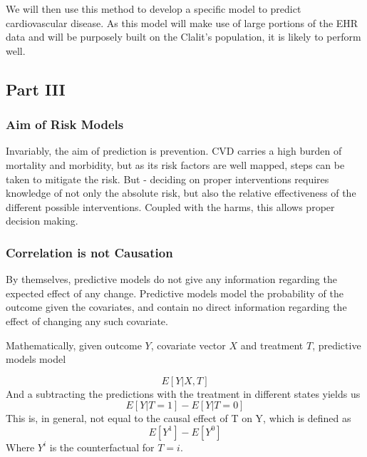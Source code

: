 \documentclass[a4paper,12pt]{article}
\begin{document}
			We will then use this method to develop a specific model to predict cardiovascular disease. As this model will make use of large portions of the EHR data and will be purposely built on the Clalit's population, it is likely to perform well.
		
		\subsection{Part III}
		
			\subsubsection{Aim of Risk Models}
			
			Invariably, the aim of prediction is prevention. CVD carries a high burden of mortality and morbidity, but as its risk factors are well mapped\cite{Yusuf2004}, steps can be taken to mitigate the risk. But - deciding on proper interventions requires knowledge of not only the absolute risk, but also the relative effectiveness of the different possible interventions. Coupled with the harms, this allows proper decision making.
			
			\subsubsection{Correlation is not Causation}
			
			By themselves, predictive models do not give any information regarding the expected effect of any change. Predictive models model the probability of the outcome given the covariates, and contain no direct information regarding the effect of changing any such covariate.
			
			Mathematically, given outcome $ Y $, covariate vector $ X $ and treatment $ T $, predictive models model
			
			\begin{equation*}
			E[Y|X,T]
			\end{equation*}
			And a subtracting the predictions with the treatment in different states yields us
			\begin{equation*}
			E[Y|T=1] - E[Y|T=0]
			\end{equation*}
			This is, in general, not equal to the causal effect of T on Y, which is defined as
			\begin{equation*}
			E[Y^1] - E[Y^0]
			\end{equation*}
			Where $ Y^i $ is the counterfactual for $ T=i $.
			
\end{document}
